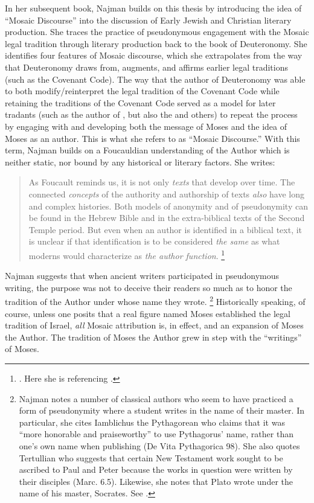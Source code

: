 In her subsequent book, Najman builds on this thesis by introducing the idea of ``Mosaic Discourse'' into the discussion of Early Jewish and Christian literary production. She traces the practice of pseudonymous engagement with the Mosaic legal tradition through literary production back to the book of Deuteronomy.\autocite[48]{najman2003} She identifies four features of Mosaic discourse, which she extrapolates from the way that Deuteronomy draws from, augments, and affirms earlier legal traditions (such as the Covenant Code). The way that the author of Deuteronomy was able to both modify/reinterpret the legal tradition of the Covenant Code while retaining the traditions of the Covenant Code served as a model for later tradants (such as the author of \jub, but also the \templescroll and others) to repeat the process by engaging with and developing both the message of Moses and the idea of Moses as an author. This is what she refers to as ``Mosaic Discourse.'' With this term, Najman builds on a Foucauldian understanding of the Author which is neither static, nor bound by any historical or literary factors. She writes:

\begin{quote}
    As Foucault reminds us, it is not only \emph{texts} that develop over time. The connected \emph{concepts} of the authority and authorship of texts \emph{also} have long and complex histories. Both models of anonymity and of pseudonymity can be found in the Hebrew Bible and in the extra-biblical texts of the Second Temple period. But even when an author is identified in a biblical text, it is unclear if that identification is to be considered \emph{the same} as what moderns would characterize as \emph{the author function}.%
        \footnote{%
            \cite[9--10]{najman2003}. Here she is referencing
            \cite[213]{foucault_essential-foucault_2}.}
\end{quote}
\noindent
Najman suggests that when ancient writers participated in pseudonymous writing, the purpose was not to deceive their readers so much as to honor the tradition of the Author under whose name they wrote.%
    \footnote{Najman notes a number of classical authors who seem to have practiced a form of pseudonymity where a student writes in the name of their master. In particular, she cites Iamblichus the Pythagorean who claims that it was ``more honorable and praiseworthy'' to use Pythagorus' name, rather than one's own name when publishing (De Vita Pythagorica 98). She also quotes Tertullian who suggests that certain New Testament work sought to be ascribed to Paul and Peter because the works in question were written by their disciples (Marc. 6.5). Likewise, she notes that Plato wrote under the name of his master, Socrates. See \cite[13]{najman2003}.}
Historically speaking, of course, unless one posits that a real figure named Moses established the legal tradition of Israel, \emph{all} Mosaic attribution is, in effect, \psgraphical and an expansion of Moses the Author. The tradition of Moses the Author grew in step with the ``writings'' of Moses.

